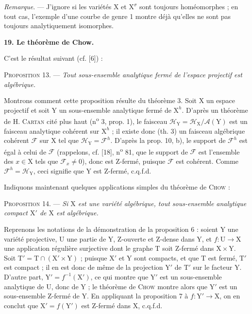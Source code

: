 
\textit{Remarque}. --- J'ignore si les variétés $\mathrm{X}$ et $\mathrm{X}^\sigma$ sont toujours homéomorphes ; en tout cas, l'exemple d'une courbe de genre 1 montre déjà qu'elles ne sont pas toujours analytiquement isomorphes.


\textbf{19. Le théorème de Chow.}

C'est le résultat suivant (cf. [6]) :

\textsc{Proposition} 13. --- \textit{Tout sous-ensemble analytique fermé de l'espace projectif est algébrique.}

Montrons comment cette proposition résulte du théorème 3. Soit $\mathrm{X}$ un espace projectif et soit $\mathrm{Y}$ un sous-ensemble analytique fermé de $\mathrm{X}^h$. D'après un théorème de H. \textsc{Cartan} cité plus haut (n\textsuperscript{o} 3, prop. 1), le faisceau $\mathcal{H}_\mathrm{Y} = \mathcal{H}_\mathrm{X}/\mathcal{A}(\mathrm{Y})$ est un faisceau analytique cohérent sur $\mathrm{X}^h$ ; il existe donc (th. 3) un faisceau algébrique cohérent $\mathcal{F}$ sur $\mathrm{X}$ tel que $\mathcal{H}_\mathrm{Y} = \mathcal{F}^h$. D'après la prop. 10, b), le support de $\mathcal{F}^h$ est égal à celui de $\mathcal{F}$ (rappelons, cf. [18], n\textsuperscript{o} 81, que le support de $\mathcal{F}$ est l'ensemble des $x \in \mathrm{X}$ tels que $\mathcal{F}_x \neq 0$), donc est Z-fermé, puisque $\mathcal{F}$ est cohérent. Comme $\mathcal{F}^h = \mathcal{H}_\mathrm{Y}$, ceci signifie que $\mathrm{Y}$ est Z-fermé, c.q.f.d.

Indiquons maintenant quelques applications simples du théorème de \textsc{Chow} :

\textsc{Proposition} 14. --- \textit{Si $\mathrm{X}$ est une variété algébrique, tout sous-ensemble analytique compact $\mathrm{X}'$ de $\mathrm{X}$ est algébrique.}

Reprenons les notations de la démonstration de la proposition 6 : soient $\mathrm{Y}$ une variété projective, $\mathrm{U}$ une partie de $\mathrm{Y}$, Z-ouverte et Z-dense dans $\mathrm{Y}$, et $f : \mathrm{U} \to \mathrm{X}$ une application régulière surjective dont le graphe $\mathrm{T}$ soit Z-fermé dans $\mathrm{X} \times \mathrm{Y}$. Soit $\mathrm{T}' = \mathrm{T} \cap (\mathrm{X}' \times \mathrm{Y})$ ; puisque $\mathrm{X}'$ et $\mathrm{Y}$ sont compacts, et que $\mathrm{T}$ est fermé, $\mathrm{T}'$ est compact ; il en est donc de même de la projection $\mathrm{Y}'$ de $\mathrm{T}'$ sur le facteur $\mathrm{Y}$. D'autre part, $\mathrm{Y}' = f^{-1}(\mathrm{X}')$, ce qui montre que $\mathrm{Y}'$ est un sous-ensemble analytique de $\mathrm{U}$, donc de $\mathrm{Y}$ ; le théorème de \textsc{Chow} montre alors que $\mathrm{Y}'$ est un sous-ensemble Z-fermé de $\mathrm{Y}$. En appliquant la proposition 7 à $f : \mathrm{Y}' \to \mathrm{X}$, on en conclut que $\mathrm{X}' = f(\mathrm{Y}')$ est Z-fermé dans $\mathrm{X}$, c.q.f.d.


